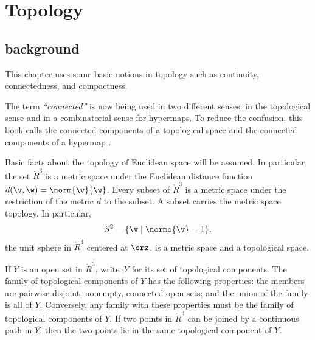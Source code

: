 \section{Topology}\label{sec:topology}

\subsection{background}

This chapter uses some basic
notions in topology such as continuity, connectedness, and compactness.

\begin{remark} The term {\it ``connected''} is now being used in two
different senses: in the topological sense and in a combinatorial
sense for hypermaps.  To reduce the confusion, this book calls the
connected components of a topological space  and the connected components of a hypermap
.
\end{remark}
%
%
%


Basic facts about the topology of Euclidean space will be assumed.  In
particular, the set $\ring{R}^3$ is a metric space under the Euclidean
distance function $d(\v,\w) = \norm{\v}{\w}$.  Every subset of
$\ring{R}^3$ is a metric space under the restriction of the metric $d$
to the subset.  A subset carries the metric space topology.  In
particular, \begin{displaymath}S^2 = \{ \v \mid \normo{ \v} =
1\},\end{displaymath} the unit sphere in $\ring{R}^3$ centered at
$\orz$, is a metric space and a topological space.

If $Y$ is an open set in $\ring{R}^3$, write
$\comp{Y}$ for its set of topological components.
%
The family of topological components of $Y$ has the following properties:
the members are pairwise disjoint, nonempty, connected open sets; and the
union of the family is all of $Y$.
Conversely, any family with these properties must be the
family of topological components of $Y$.
If two
points in $\ring{R}^3$ 
can be joined by a continuous path in $Y$,
then the two points lie in the same topological component of $Y$.
%
%
%







